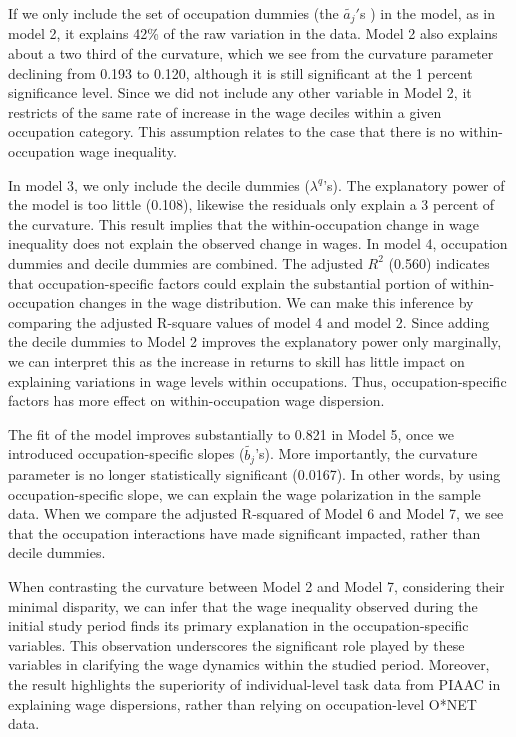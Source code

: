\begin{onehalfspace}
If we only include the set of occupation dummies (the $\widetilde{a_{j}}'$s
) in the model, as in model 2, it explains 42\% of the raw variation
in the data. Model 2 also explains about a two third of the curvature,
which we see from the curvature parameter declining from 0.193 to
0.120, although it is still significant at the 1 percent significance
level. Since we did not include any other variable in Model 2, it
restricts of the same rate of increase in the wage deciles within
a given occupation category. This assumption relates to the case that
there is no within-occupation wage inequality. 

In model 3, we only include the decile dummies ($\lambda^{q}$'s).
The explanatory power of the model is too little (0.108), likewise
the residuals only explain a 3 percent of the curvature. This result
implies that the within-occupation change in wage inequality does
not explain the observed change in wages. In model 4, occupation dummies
and decile dummies are combined. The adjusted $R^{2}$ (0.560) indicates
that occupation-specific factors could explain the substantial portion
of within-occupation changes in the wage distribution. We can make
this inference by comparing the adjusted R-square values of model
4 and model 2. Since adding the decile dummies to Model 2 improves
the explanatory power only marginally, we can interpret this as the
increase in returns to skill has little impact on explaining variations
in wage levels within occupations. Thus, occupation-specific factors
has more effect on within-occupation wage dispersion.

The fit of the model improves substantially to 0.821 in Model 5, once
we introduced occupation-specific slopes ($\widetilde{b_{j}}$'s).
More importantly, the curvature parameter is no longer statistically
significant (0.0167). In other words, by using occupation-specific
slope, we can explain the wage polarization in the sample data. When
we compare the adjusted R-squared of Model 6 and Model 7, we see that
the occupation interactions have made significant impacted, rather
than decile dummies.

When contrasting the curvature between Model 2 and Model 7, considering
their minimal disparity, we can infer that the wage inequality observed
during the initial study period finds its primary explanation in the
occupation-specific variables. This observation underscores the significant
role played by these variables in clarifying the wage dynamics within
the studied period. Moreover, the result highlights the superiority
of individual-level task data from PIAAC in explaining wage dispersions,
rather than relying on occupation-level O{*}NET data.
\end{onehalfspace}
\begin{center}
\newpage
\par\end{center}
